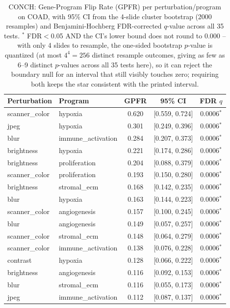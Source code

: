 \begin{table}[t]
\centering
\caption{CONCH: Gene-Program Flip Rate (GPFR) per perturbation/program on COAD, with 95\% CI from the 4-slide cluster bootstrap (2000 resamples) and Benjamini-Hochberg FDR-corrected $q$-value across all 35 tests. $^{*}$ FDR$<$0.05 AND the CI's lower bound does not round to 0.000 -- with only 4 slides to resample, the one-sided bootstrap $p$-value is quantized (at most $4^4=256$ distinct resample outcomes, giving as few as 6--9 distinct $p$-values across all 35 tests here), so it can reject the boundary null for an interval that still visibly touches zero; requiring both keeps the star consistent with the printed interval.}
\label{tab:gpfr_coad_conch}
\begin{tabular}{llccc}
\toprule
Perturbation & Program & GPFR & 95\% CI & FDR $q$ \\
\midrule
scanner\_color & hypoxia & 0.620 & [0.559, 0.724] & 0.0006$^{*}$ \\
jpeg & hypoxia & 0.301 & [0.249, 0.396] & 0.0006$^{*}$ \\
blur & immune\_activation & 0.284 & [0.207, 0.373] & 0.0006$^{*}$ \\
brightness & hypoxia & 0.221 & [0.174, 0.286] & 0.0006$^{*}$ \\
brightness & proliferation & 0.204 & [0.088, 0.379] & 0.0006$^{*}$ \\
scanner\_color & proliferation & 0.193 & [0.150, 0.280] & 0.0006$^{*}$ \\
brightness & stromal\_ecm & 0.168 & [0.142, 0.235] & 0.0006$^{*}$ \\
blur & hypoxia & 0.163 & [0.144, 0.223] & 0.0006$^{*}$ \\
scanner\_color & angiogenesis & 0.157 & [0.100, 0.245] & 0.0006$^{*}$ \\
blur & angiogenesis & 0.149 & [0.057, 0.257] & 0.0006$^{*}$ \\
scanner\_color & stromal\_ecm & 0.148 & [0.064, 0.279] & 0.0006$^{*}$ \\
scanner\_color & immune\_activation & 0.138 & [0.076, 0.228] & 0.0006$^{*}$ \\
contrast & hypoxia & 0.128 & [0.066, 0.222] & 0.0006$^{*}$ \\
brightness & angiogenesis & 0.116 & [0.092, 0.153] & 0.0006$^{*}$ \\
blur & stromal\_ecm & 0.116 & [0.055, 0.173] & 0.0006$^{*}$ \\
jpeg & immune\_activation & 0.112 & [0.087, 0.137] & 0.0006$^{*}$ \\

\end{tabular}
\end{table}
